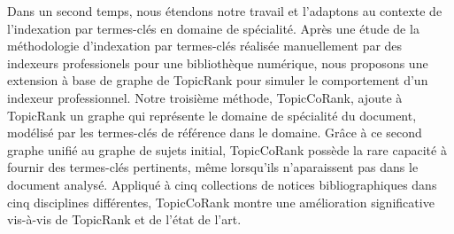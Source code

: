 Dans un second temps, nous étendons notre travail et l'adaptons au contexte de
l'indexation par termes-clés en domaine de spécialité. Après une étude de la
méthodologie d'indexation par termes-clés réalisée manuellement par des
indexeurs professionels pour une bibliothèque numérique, nous proposons une
extension \og{}à base de graphe\fg{} de TopicRank pour simuler le comportement
d'un indexeur professionnel. Notre troisième méthode, TopicCoRank, ajoute à
TopicRank un graphe qui représente le domaine de spécialité du document,
modélisé par les termes-clés de référence dans le domaine. Grâce à ce second
graphe unifié au graphe de sujets initial, TopicCoRank possède la rare capacité
à fournir des termes-clés pertinents, même lorsqu'ils n'aparaissent pas dans le
document analysé. Appliqué à cinq collections de notices bibliographiques dans
cinq disciplines différentes, TopicCoRank montre une amélioration significative
vis-à-vis de TopicRank et de l'état de l'art.
